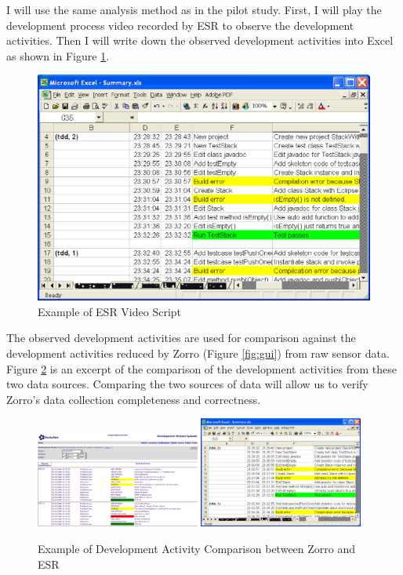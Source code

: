 I will use the same analysis method as in the pilot study. First, I
will play the development process video recorded by ESR to observe the
development activities. Then I will write down the observed
development activities into Excel as shown in Figure
\ref{fig:VideoExcel}.
\begin{figure}[htbp]
  \centering
  \includegraphics[width=1.0\textwidth]{figs/VideoScriptExcel}
  \caption{Example of ESR Video Script}\label{fig:VideoExcel}
\end{figure}

The observed development activities are used for comparison against the
development activities reduced by Zorro (Figure \ref{fig:gui}) from
raw sensor data. Figure \ref{fig:DataVerification} is an excerpt of the
comparison of the development activities from these two data
sources. Comparing the two sources of data will allow us to verify
Zorro's data collection completeness and correctness.
\begin{figure}[hbtp]  
\centering
\includegraphics[width=0.48\textwidth]{figs/Zorro-Gui} 
\includegraphics[width=0.48\textwidth]{figs/VideoScriptExcel}
\caption{Example of Development Activity Comparison between Zorro and
ESR}
\label{fig:DataVerification}
\end{figure}


